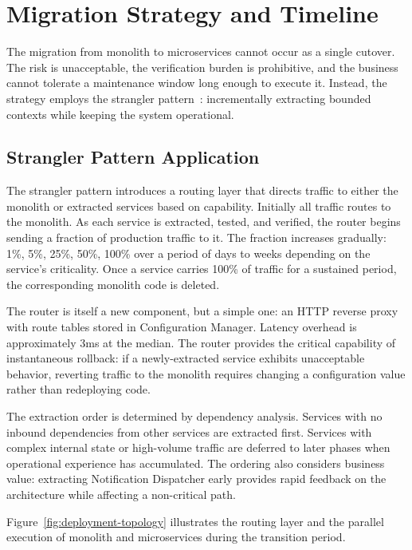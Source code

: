 \section{Migration Strategy and Timeline}

The migration from monolith to microservices cannot occur as a single cutover. The risk is unacceptable, the verification burden is prohibitive, and the business cannot tolerate a maintenance window long enough to execute it. Instead, the strategy employs the strangler pattern~\cite{newman-monolith-to-microservices-2019}: incrementally extracting bounded contexts while keeping the system operational.

\subsection{Strangler Pattern Application}

The strangler pattern introduces a routing layer that directs traffic to either the monolith or extracted services based on capability. Initially all traffic routes to the monolith. As each service is extracted, tested, and verified, the router begins sending a fraction of production traffic to it. The fraction increases gradually: 1\%, 5\%, 25\%, 50\%, 100\% over a period of days to weeks depending on the service's criticality. Once a service carries 100\% of traffic for a sustained period, the corresponding monolith code is deleted.

The router is itself a new component, but a simple one: an HTTP reverse proxy with route tables stored in Configuration Manager. Latency overhead is approximately 3ms at the median. The router provides the critical capability of instantaneous rollback: if a newly-extracted service exhibits unacceptable behavior, reverting traffic to the monolith requires changing a configuration value rather than redeploying code.

The extraction order is determined by dependency analysis. Services with no inbound dependencies from other services are extracted first. Services with complex internal state or high-volume traffic are deferred to later phases when operational experience has accumulated. The ordering also considers business value: extracting Notification Dispatcher early provides rapid feedback on the architecture while affecting a non-critical path.

Figure~\ref{fig:deployment-topology} illustrates the routing layer and the parallel execution of monolith and microservices during the transition period.

